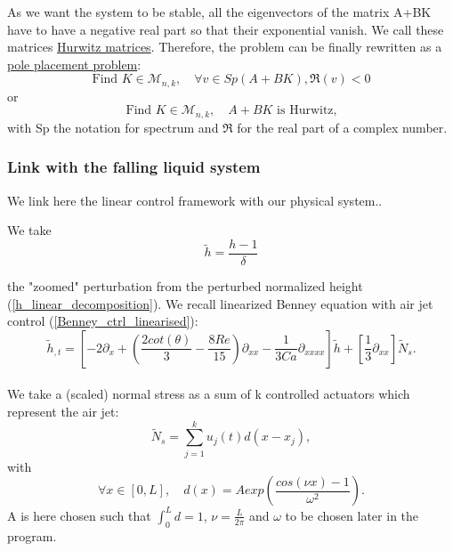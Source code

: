 \documentclass[12pt]{article}
\begin{document}
As we want the system to be stable, all the eigenvectors of the matrix A+BK have to have a negative real part so that their exponential vanish. We call these matrices \underline{Hurwitz matrices}. 
Therefore, the problem can be finally rewritten as a \underline{pole placement problem}: 
\begin{equation}\label{eq_pole_placement}
\boxed{
    \text{Find } K \in \mathcal{M}_{n,k},\quad \forall v \in Sp(A+BK), \mathfrak{R}(v) <0
    }
\end{equation}
or 
\begin{equation}\label{eq_pole_placement_Hurwitz}
    \text{Find } K \in \mathcal{M}_{n,k},\quad A+BK \text{ is Hurwitz,}
\end{equation}
with Sp the notation for spectrum and $\mathfrak{R}$ for the real part of a complex number.
\subsubsection{Link with the falling liquid system}\label{sub_section_link_ctr_FLF}
We link here the linear control framework with our physical system.. 

We take 
\begin{equation}
\tilde{h} = \frac{h-1}{\delta}
\end{equation}

the "zoomed" perturbation from the perturbed normalized height (\ref{h_linear_decomposition}). We recall linearized Benney equation with air jet control (\ref{Benney_ctrl_linearised}):
$$\tilde{h}_{,t} = \left[ -2\partial_x + (\frac{2cot(\theta)}{3}-\frac{8Re}{15})\partial_{xx} - \frac{1}{3Ca}\partial_{xxxx}\right]\tilde{h} + \left[ \frac{1}{3}\partial_{xx}\right]\tilde{N}_s.$$
\\

We take a (scaled) normal stress as a sum of k controlled actuators which represent the air jet: 
\begin{equation}
\boxed{
    \tilde{N}_s = \sum_{j=1}^ku_j(t)d(x-x_j),
}
\end{equation}
with 
\begin{equation}
    \forall x \in [0,L], \quad d(x)=Aexp\left(\frac{cos(\nu x)-1}{\omega^2}\right).
\end{equation}
A is here chosen such that $\int_0^Ld = 1$, $\nu=\frac{L}{2\pi}$ and $\omega$ to be chosen later in the program.\\
\end{document}
